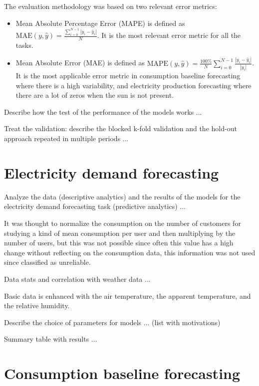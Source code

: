 The evaluation methodology was based on two relevant error metrics:
\begin{itemize}
  \item Mean Absolute Percentage Error (MAPE) is defined as $\text{MAE}(y, \hat{y}) = \frac{ \sum_{i=0}^{N - 1} |y_i - \hat{y}_i| }{N}$. It is the most relevant error metric for all the tasks.
  \item Mean Absolute Error (MAE) is defined as $\text{MAPE}(y, \hat{y}) = \frac{100\%}{N} \sum_{i=0}^{N - 1} \frac{|y_i - \hat{y}_i|}{|y_i|}$. It is the most applicable error metric in consumption baseline forecasting where there is a high variability, and electricity production forecasting where there are a lot of zeros when the sun is not present.
\end{itemize}

Describe how the test of the performance of the models works ...

Treat the validation: describe the blocked k-fold validation and the hold-out approach repeated in multiple periods ...


\section{Electricity demand forecasting}
\label{sec:demandval}
\vspace{0.2 cm}

Analyze the data (descriptive analytics) and the results of the models for the electricity demand forecasting task (predictive analytics) ...

It was thought to normalize the consumption on the number of customers for studying a kind of mean consumption per user and then multiplying by the number of users, but this was not possible since often this value has a high change without reflecting on the consumption data, this information was not used since classified as unreliable.

Data stats and correlation with weather data ...

Basic data is enhanced with the air temperature, the apparent temperature, and the relative humidity.

Describe the choice of parameters for models ... (list with motivations)

Summary table with results ...


\section{Consumption baseline forecasting}
\label{sec:baselineval}
\vspace{0.2 cm}

